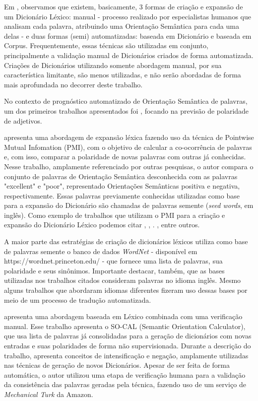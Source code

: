 \documentclass[a4paper,11pt]{article}
\begin{document}
Em \cite{kdir16}, observamos que existem, basicamente, 3 formas de criação e expansão de um Dicionário Léxico: manual -  processo realizado por especialistas humanos que analisam cada palavra, atribuindo uma Orientação Semântica para cada uma delas -  e duas formas (semi) automatizadas: baseada em Dicionário e baseada em Corpus. Frequentemente, essas técnicas são utilizadas em conjunto, principalmente a validação manual de Dicionários criados de forma automatizada. Criações de Dicionários utilizando somente abordagem manual, por sua característica limitante, são menos utilizadas, e não serão abordadas de forma mais aprofundada no decorrer deste trabalho.

No contexto de prognóstico automatizado de Orientação Semântica de palavras, um dos primeiros trabalhos apresentados foi \cite{Hatzivassiloglou}, focando na previsão de polaridade de adjetivos.

\cite{Turney2002} apresenta uma abordagem de expansão léxica fazendo uso da técnica de Pointwise Mutual Infomation (PMI), com o objetivo de calcular a co-ocorrência de palavras e, com isso, comparar a polaridade de novas palavras com outras já conhecidas. Nesse trabalho, amplamente referenciado por outras pesquisas, o autor compara o conjunto de palavras de Orientação Semântica desconhecida com as palavras "excellent" e "poor", representado Orientações Semânticas positiva e negativa, respectivamente. Essas palavras previamente conhecidas utilizadas como base para a expansão do Dicionário são chamadas de palavras semente (\emph{seed words}, em inglês). Como exemplo de trabalhos que utilizam o PMI para a criação e expansão do Dicionário Léxico podemos citar \cite{becker2013}, \cite{Zhou2014}, \cite{Pinto2007}. \cite{Pantel2006}, entre outros.

A maior parte das estratégias de criação de dicionários léxicos utiliza como base de palavras semente o banco de dados \emph{WordNet} - disponível em https://wordnet.princeton.edu/ - que fornece uma lista de palavras, sua polaridade e seus sinônimos. Importante destacar, também, que as bases utilizadas nos trabalhos citados consideram palavras no idioma inglês. Mesmo alguns trabalhos que abordaram idiomas diferentes fizeram uso dessas bases por meio de um processo de tradução automatizada.

\cite{taboada2011lexicon} apresenta uma abordagem baseada em Léxico combinada com uma verificação manual. Esse trabalho apresenta o SO-CAL (Semantic Orientation Calculator), que usa lista de palavras já consolidadas para a geração de dicionários com novas entradas e suas polaridades de forma não supervisionada. Durante a descrição do trabalho, apresenta conceitos de intensificação e negação, amplamente utilizadas nas técnicas de geração de novos Dicionários. Apesar de ser feita de forma automática, o autor utilizou uma etapa de verificação humana para a validação da consistência das palavras geradas pela técnica, fazendo uso de um serviço de\emph{ Mechanical Turk} da Amazon. 
\end{document}
